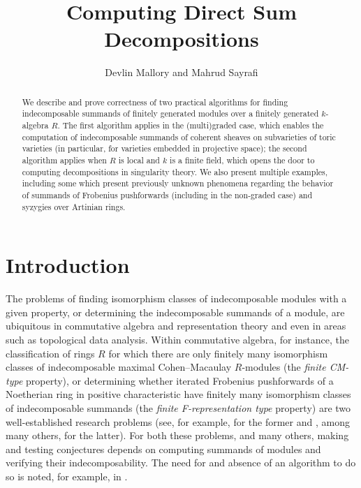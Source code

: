 \documentclass[12pt]{article}
\title{Computing Direct Sum Decompositions}
\author{Devlin Mallory and Mahrud Sayrafi}
\theoremstyle{theorem}
\numberwithin{thm}{section}
\theoremstyle{definition}
\begin{document}
\maketitle

\begin{abstract}
  We describe and prove correctness of two practical algorithms for finding indecomposable summands of finitely generated modules over a finitely generated $k$-algebra $R$. The first algorithm applies in the (multi)graded case, which enables the computation of indecomposable summands of coherent sheaves on subvarieties of toric varieties (in particular, for varieties embedded in projective space); the second algorithm applies when $R$ is local and $k$ is a finite field, which opens the door to computing decompositions in singularity theory. We also present multiple examples, including some which present previously unknown phenomena regarding the behavior of summands of Frobenius pushforwards (including in the non-graded case) and syzygies over Artinian rings.
\end{abstract}

\section{Introduction}

The problems of finding isomorphism classes of indecomposable modules with a given property, or determining the indecomposable summands of a module, are ubiquitous in commutative algebra and representation theory and even in areas such as topological data analysis. Within commutative algebra, for instance, the classification of rings $R$ for which there are only finitely many isomorphism classes of indecomposable maximal Cohen--Macaulay $R$-modules (the \emph{finite CM-type} property), or determining whether iterated Frobenius pushforwards of a Noetherian ring in positive characteristic have finitely many isomorphism classes of indecomposable summands (the \emph{finite F-representation type} property) are two well-established research problems (see, for example, \cite{Yoshino90,LW12} for the former and \cite{SVdB97,Hara15,TT08}, among many others, for the latter). For both these problems, and many others, making and testing conjectures depends on computing summands of modules and verifying their indecomposability.
The need for and absence of an algorithm to do so is noted, for example, in
\cite[15.10.9]{Eisenbud95}.
\end{document}
